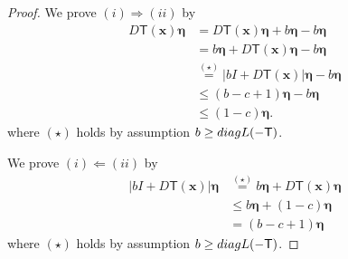\documentclass[10pt,a4paper]{amsart}
\newcommand{\Ts}{\mathsf{T}}
\newcommand{\abs}[1]{{\left\vert #1 \right\vert}}
\newcommand{\etab}{\boldsymbol{\eta}}
\newcommand{\norm}[1]{{\left\vert\kern-0.25ex\left\vert #1\right\vert\kern-0.25ex\right\vert}}
\newcommand{\xb}{\boldsymbol{x}}
\begin{document}
\begin{proof}
%
We prove $(i)\Rightarrow (ii)$ by
%
\begingroup
$$
\begin{aligned}
        D\Ts(\xb)\etab  &= D\Ts(\xb)\etab +b\etab -  b\etab\\
        &= b\etab + D\Ts(\xb)\etab - b\etab \\
        & \overset{(\star)}{=} \abs{b I + D\Ts(\xb)}\etab - b\etab \\
        & \leq (b-c+1)\etab - b\etab \\
        & \leq (1-c)\etab.
\end{aligned}
$$
\endgroup
%
where $(\star)$ holds by assumption $b\geq \textnormal{diagL}(-\Ts)$.
%

We prove $(i)\Leftarrow (ii)$  by
%
$$
\begin{aligned}
\abs{bI + D\Ts(\xb)}\etab & \overset{(\star)}{=}  b\etab + D\Ts(\xb)\etab\\
& \leq b\etab + (1-c)\etab\\
%
& = (b-c+1)\etab
\end{aligned}
$$
where $(\star)$ holds by assumption $b\geq \textnormal{diagL}(-\Ts)$.

\end{proof}
\end{document}
